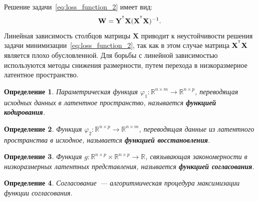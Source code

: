 \documentclass[12pt]{article}
\newcommand{\bY}{\mathbf{Y}}
\newcommand{\bX}{\mathbf{X}}
\newcommand{\bW}{\mathbf{W}}
\newcommand{\T}{^{\text{\tiny\sffamily\upshape\mdseries T}}}
\newtheorem{definition}{Определение}[section]
\begin{document}
	\noindent Решение задачи~\eqref{eq:loss_function_2} имеет вид:
	\begin{equation*}
		\bW = \bY^{\T} \bX (\bX^{\T} \bX)^{-1}.
	\end{equation*}
	Линейная зависимость столбцов матрицы $\bX$ приводит к неустойчивости решения задачи минимизации~\eqref{eq:loss_function_2}, так как в этом случае матрица ${\bX}^{\T} \bX$ является плохо обусловленной. Для борьбы с линейной зависимостью используются методы снижения размерности, путем перехода в низкоразмерное латентное пространство.
	
	\begin{definition}
		Параметрическая функция $\varphi_1: \mathbb{R}^{n \times m} \to \mathbb{R}^{n \times p}$, переводящая исходных данных в латентное пространство, называется \textbf{функцией кодирования}.
	\end{definition}
	
	\begin{definition}
		Функция $\varphi_2: \mathbb{R}^{n \times p} \to \mathbb{R}^{n \times m}$, переводящая данные из латентного пространства в исходное, называется \textbf{функцией восстановления}.
	\end{definition}
	
	\begin{definition}
		Функция $g: \mathbb{R}^{n \times p}\times \mathbb{R}^{n \times p} \to \mathbb{R}$, связывающая закономерности в низкоразмерных латентных представления, называется \textbf{функцией согласования}.
	\end{definition}
	
	\begin{definition}
		Согласование~--- алгоритмическая процедура максимизации функции согласования.
	\end{definition}
	
\end{document}
